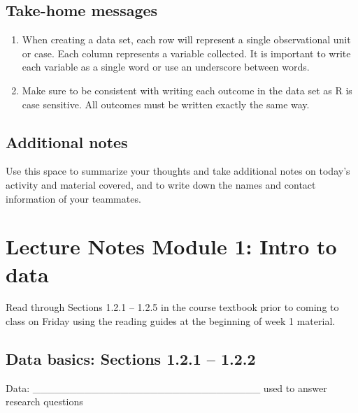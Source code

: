 \documentclass[
]{report}
\begin{document}
\hypertarget{take-home-messages}{%
\subsection{Take-home messages}\label{take-home-messages}}

\begin{enumerate}
\def\labelenumi{\arabic{enumi}.}
\item
  When creating a data set, each row will represent a single observational unit or case. Each column represents a variable collected. It is important to write each variable as a single word or use an underscore between words.
\item
  Make sure to be consistent with writing each outcome in the data set as R is case sensitive. All outcomes must be written exactly the same way.
\end{enumerate}

\hypertarget{additional-notes}{%
\subsection{Additional notes}\label{additional-notes}}

Use this space to summarize your thoughts and take additional notes on today's activity and material covered, and to write down the names and contact information of your teammates.

\newpage

\hypertarget{lecture-notes-module-1-intro-to-data}{%
\section{Lecture Notes Module 1: Intro to data}\label{lecture-notes-module-1-intro-to-data}}


Read through Sections 1.2.1 -- 1.2.5 in the course textbook prior to coming to class on Friday using the reading guides at the beginning of week 1 material.

\hypertarget{data-basics-sections-1.2.1-1.2.2}{%
\subsection*{Data basics: Sections 1.2.1 -- 1.2.2}\label{data-basics-sections-1.2.1-1.2.2}}

Data: \_\_\_\_\_\_\_\_\_\_\_\_\_\_\_\_\_\_\_\_\_\_\_\_\_\_\_\_\_\_\_ used to answer research questions
\end{document}
